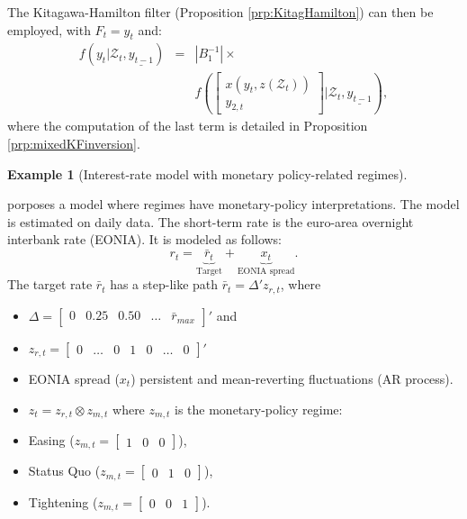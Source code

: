 \documentclass[
  12pt,
]{book}
\providecommand{\tightlist}{%
  \setlength{\itemsep}{0pt}\setlength{\parskip}{0pt}}
\theoremstyle{definition}
\theoremstyle{definition}
\newtheorem{example}{Example}[chapter]
\theoremstyle{definition}
\theoremstyle{definition}
\theoremstyle{remark}
\begin{document}
The Kitagawa-Hamilton filter (Proposition \ref{prp:KitagHamilton}) can then be employed, with \(F_t = y_t\) and:
\begin{eqnarray}
f(y_t|\mathcal{Z}_t,\underline{y_{t-1}}) &=&|B_1^{-1}| \times \nonumber \\
&& f\left(\left[\begin{array}{c}x(y_t,z(\mathcal{Z}_t))\\ y_{2,t}\end{array}\right]|\mathcal{Z}_t,\underline{y_{t-1}}\right),\label{eq:conddistri4KHfilter}
\end{eqnarray}
where the computation of the last term is detailed in Proposition \ref{prp:mixedKFinversion}.

\begin{example}[Interest-rate model with monetary policy-related regimes]
\protect\hypertarget{exm:RSMP}{}\label{exm:RSMP}

\citet{Renne_2017} porposes a model where regimes have monetary-policy interpretations. The model is estimated on daily data. The short-term rate is the euro-area overnight interbank rate (EONIA). It is modeled as follows:
\begin{equation}
\boxed{r_{t}=\underset{\mbox{Target}}{\underbrace{\bar{r}_{t}}}+\underset{\mbox{EONIA spread}}{\underbrace{x_{t}}}.}
\end{equation}
The target rate \(\bar{r}_{t}\) has a step-like path \(\bar{r}_{t}=\Delta'z_{r,t}\),
where

\begin{itemize}
\tightlist
\item
  \(\Delta=[\begin{array}{ccccc} 0 & 0.25 & 0.50 & \ldots & \bar{r}_{max}\end{array}]'\) and
\item
  \(z_{r,t}=[\begin{array}{ccccccc} 0 & \ldots & 0 & 1 & 0 & \ldots & 0\end{array}]'\)
\item
  EONIA spread (\(x_t\)) persistent and mean-reverting fluctuations (AR process).
\item
  \(z_t = z_{r,t}\otimes z_{m,t}\) where \(z_{m,t}\) is the monetary-policy regime:
\item
  Easing (\(z_{m,t}=[\begin{array}{ccc} 1 & 0 & 0\end{array}]\)),
\item
  Status Quo (\(z_{m,t}=[\begin{array}{ccc} 0 & 1 & 0\end{array}]\)),
\item
  Tightening (\(z_{m,t}=[\begin{array}{ccc} 0 & 0 & 1\end{array}]\)).
\end{itemize}


\end{example}
\end{document}
